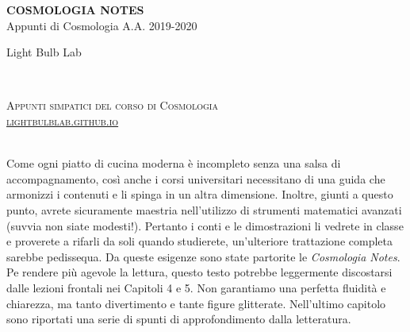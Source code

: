 \documentclass[11pt,fleqn]{book} %
\begin{document}

\begingroup
\thispagestyle{empty}
\centering
\vspace*{5cm}
\par\normalfont\fontsize{35}{35}\sffamily\selectfont
\textbf{COSMOLOGIA NOTES}\\
{\LARGE Appunti di Cosmologia A.A. 2019-2020}\par %
\vspace*{1cm}
{\Huge Light Bulb Lab}\par %
\endgroup


\newpage
~\vfill
\thispagestyle{empty}

\noindent \textsc{Appunti simpatici del corso di Cosmologia} \\

\noindent \textsc{\href{https://lightbulblab.github.io}{lightbulblab.github.io}} \\ %

~\vfill

\noindent Come ogni piatto di cucina moderna è incompleto senza una salsa di accompagnamento, così anche i corsi universitari necessitano di una guida che armonizzi i contenuti e li spinga in un altra dimensione. Inoltre, giunti a questo punto, avrete sicuramente maestria nell'utilizzo di strumenti matematici avanzati (suvvia non siate modesti!). Pertanto i conti e le dimostrazioni li vedrete in classe e proverete a rifarli da soli quando studierete, un'ulteriore trattazione completa sarebbe pedissequa.  Da queste esigenze sono state partorite le \textit{Cosmologia Notes}. Pe rendere più agevole la lettura, questo testo potrebbe leggermente discostarsi dalle lezioni frontali nei Capitoli 4 e 5. Non garantiamo una perfetta fluidità e chiarezza, ma tanto divertimento e tante figure glitterate. Nell'ultimo capitolo sono riportati una serie di spunti di approfondimento dalla letteratura.  \\ %

~\vfill
\end{document}
